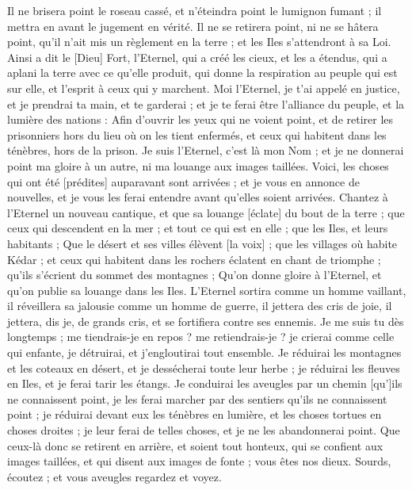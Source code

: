\begin{multicols}{2}
Il ne brisera point le roseau cassé, et n'éteindra point le lumignon fumant ; il mettra en avant le jugement en vérité.
Il ne se retirera point, ni ne se hâtera point, qu'il n'ait mis un règlement en la terre ; et les Iles s'attendront à sa Loi.
Ainsi a dit le [Dieu] Fort, l'Eternel, qui a créé les cieux, et les a étendus, qui a aplani la terre avec ce qu'elle produit, qui donne la respiration au peuple qui est sur elle, et l'esprit à ceux qui y marchent.
Moi l'Eternel, je t'ai appelé en justice, et je prendrai ta main, et te garderai ; et je te ferai être l'alliance du peuple, et la lumière des nations :
Afin d'ouvrir les yeux qui ne voient point, et de retirer les prisonniers hors du lieu où on les tient enfermés, et ceux qui habitent dans les ténèbres, hors de la prison.
Je suis l'Eternel, c'est là mon Nom ; et je ne donnerai point ma gloire à un autre, ni ma louange aux images taillées.
Voici, les choses qui ont été [prédites] auparavant sont arrivées ; et je vous en annonce de nouvelles, et je vous les ferai entendre avant qu'elles soient arrivées.
Chantez à l'Eternel un nouveau cantique, et que sa louange [éclate] du bout de la terre ; que ceux qui descendent en la mer ; et tout ce qui est en elle ; que les Iles, et leurs habitants ;
Que le désert et ses villes élèvent [la voix] ; que les villages où habite Kédar ; et ceux qui habitent dans les rochers éclatent en chant de triomphe ; qu'ils s'écrient du sommet des montagnes ;
Qu'on donne gloire à l'Eternel, et qu'on publie sa louange dans les Iles.
L'Eternel sortira comme un homme vaillant, il réveillera sa jalousie comme un homme de guerre, il jettera des cris de joie, il jettera, dis je, de grands cris, et se fortifiera contre ses ennemis.
Je me suis tu dès longtemps ; me tiendrais-je en repos ? me retiendrais-je ? je crierai comme celle qui enfante, je détruirai, et j'engloutirai tout ensemble.
Je réduirai les montagnes et les coteaux en désert, et je dessécherai toute leur herbe ; je réduirai les fleuves en Iles, et je ferai tarir les étangs.
Je conduirai les aveugles par un chemin [qu']ils ne connaissent point, je les ferai marcher par des sentiers qu'ils ne connaissent point ; je réduirai devant eux les ténèbres en lumière, et les choses tortues en choses droites ; je leur ferai de telles choses, et je ne les abandonnerai point.
Que ceux-là donc se retirent en arrière, et soient tout honteux, qui se confient aux images taillées, et qui disent aux images de fonte ; vous êtes nos dieux.
Sourds, écoutez ; et vous aveugles regardez et voyez.

\end{multicols}
